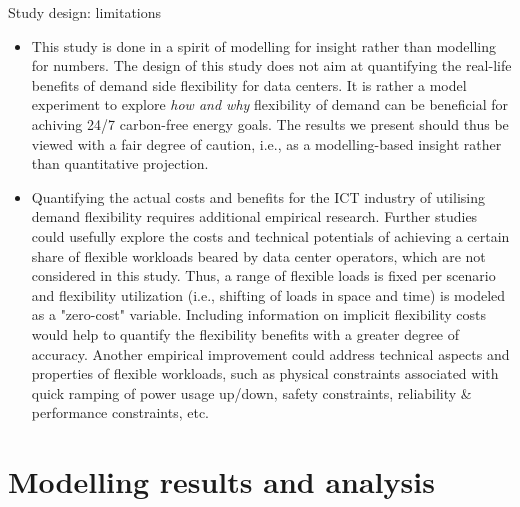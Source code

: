 \begin{frame}{Study design: limitations}
  
  {\footnotesize 
  \begin{itemize}

  \item This study is done in a spirit of \alert{modelling for insight} rather than \alert{modelling for numbers}. The design of this study does not aim at quantifying the real-life benefits of demand side flexibility for data centers. It is rather a model experiment to explore \textit{how and why} flexibility of demand can be beneficial for achiving 24/7 carbon-free energy goals. The results we present should thus be viewed with a fair degree of caution, i.e., as a modelling-based insight rather than quantitative projection. 
  
  \item Quantifying the actual costs and benefits for the ICT industry of utilising demand flexibility requires \alert{additional empirical research}. Further studies could usefully explore the costs and technical potentials of achieving a certain share of flexible workloads beared by data center operators, which are \alert{not considered} in this study. Thus, a range of flexible loads is fixed per scenario and flexibility utilization (i.e., shifting of loads in space and time) is modeled as a "zero-cost" variable. Including information on implicit flexibility costs would help to quantify the flexibility benefits with a greater degree of accuracy. Another empirical improvement could address technical aspects and properties of flexible workloads, such as physical constraints associated with quick ramping of power usage up/down, safety constraints, reliability \& performance constraints, etc.
  
  \end{itemize}
  }
  \end{frame}


\section{Modelling results and analysis}



